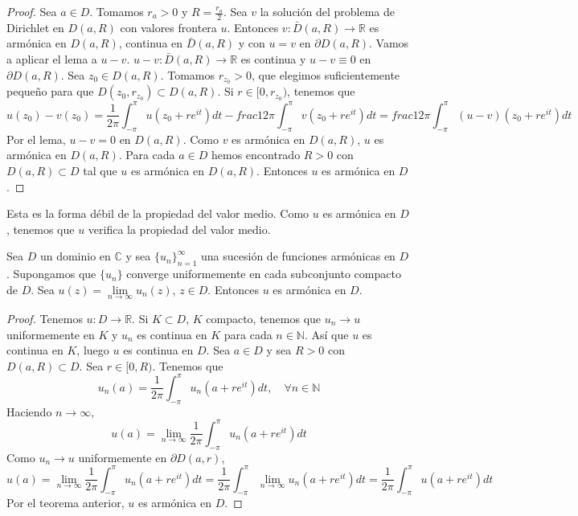 \begin{proof}
    Sea $a \in D$.
    Tomamos $r_a > 0$ y $R = \frac{r_a}{2}$.
    Sea $v$ la solución del problema de Dirichlet en $D(a, R)$ con valores frontera $u$.
    Entonces $v: \bar{D}(a, R) \to \mathbb{R}$ es armónica en $D(a, R)$, continua en $\bar{D}(a, R)$ y con $u = v$ en $\partial D(a, R)$.
    Vamos a aplicar el lema a $u-v$.
    $u-v: \bar{D}(a, R) \to \mathbb{R}$ es continua y $u-v \equiv 0$ en $\partial D(a, R)$.
    Sea $z_0 \in D(a, R)$.
    Tomamos $r_{z_0} > 0$, que elegimos suficientemente pequeño para que $D(z_0, r_{z_0}) \subset D(a, R)$.
    Si $r \in [0, r_{z_0})$, tenemos que
    $$u(z_0)-v(z_0) = \frac{1}{2\pi} \int_{-\pi}^\pi u(z_0 + re^{it})dt - frac{1}{2\pi} \int_{-\pi}^\pi v(z_0 + re^{it})dt = frac{1}{2\pi} \int_{-\pi}^\pi (u-v)(z_0 + re^{it})dt$$
    Por el lema, $u-v = 0$ en $D(a, R)$.
    Como $v$ es armónica en $D(a, R)$, $u$ es armónica en $D(a, R)$.
    Para cada $a \in D$ hemos encontrado $R > 0$ con $D(a, R) \subset D$ tal que $u$ es armónica en $D(a, R)$.
    Entonces $u$ es armónica en $D$.
\end{proof}

\begin{remark}
    Esta es la forma débil de la propiedad del valor medio.
    Como $u$ es armónica en $D$, tenemos que $u$ verifica la propiedad del valor medio.
\end{remark}

\begin{theorem}
    Sea $D$ un dominio en $\mathbb{C}$ y sea $\{u_n\}_{n=1}^\infty$ una sucesión de funciones armónicas en $D$.
    Supongamos que $\{u_n\}$ converge uniformemente en cada subconjunto compacto de $D$.
    Sea $u(z) = \lim\limits_{n \to \infty} u_n(z)$, $z \in D$.
    Entonces $u$ es armónica en $D$.
\end{theorem}

\begin{proof}
    Tenemos $u: D \to \mathbb{R}$.
    Si $K \subset D$, $K$ compacto, tenemos que $u_n \to u$ uniformemente en $K$ y $u_n$ es continua en $K$ para cada $n \in \mathbb{N}$.
    Así que $u$ es continua en $K$, luego $u$ es continua en $D$.
    Sea $a \in D$ y sea $R > 0$ con $D(a, R) \subset D$.
    Sea $r \in [0, R)$.
    Tenemos que
    $$u_n(a) = \frac{1}{2\pi} \int_{-\pi}^\pi u_n(a + re^{it})dt, \quad \forall n \in \mathbb{N}$$
    Haciendo $n \to \infty$,
    $$u(a) = \lim_{n \to \infty} \frac{1}{2\pi} \int_{-\pi}^\pi u_n(a + re^{it})dt$$
    Como $u_n \to u$ uniformemente en $\partial D(a, r)$,
    $$u(a) = \lim_{n \to \infty} \frac{1}{2\pi} \int_{-\pi}^\pi u_n(a + re^{it})dt = \frac{1}{2\pi} \int_{-\pi}^\pi \lim_{n \to \infty} u_n(a + re^{it})dt = \frac{1}{2\pi} \int_{-\pi}^\pi u(a + re^{it})dt$$
    Por el teorema anterior, $u$ es armónica en $D$.
\end{proof}

